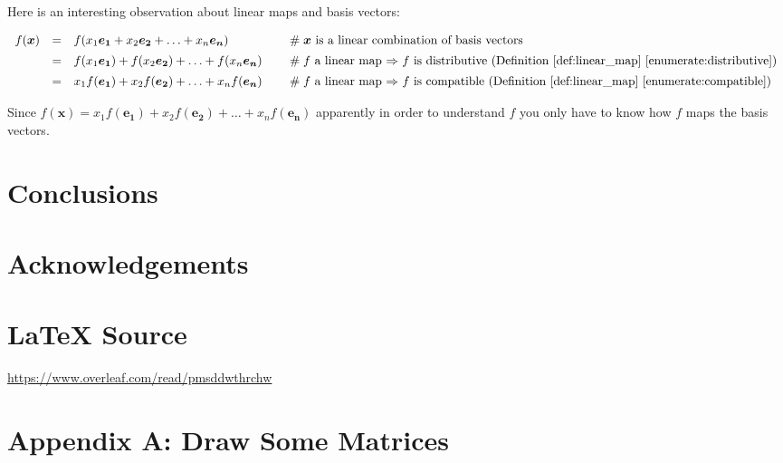 \documentclass{article}
\theoremstyle{definition}
\begin{document}
\bigskip
\noindent
Here is an interesting observation about linear maps and basis vectors:

\begin{equation*}
\begin{array}{llll}
f(\bm{x})
&=& f(x_1 \bm{e_1} + x_2 \bm{e_2} + \hdots + x_n \bm{e_n})				
		&\hspace{1.25em} \mathrel{\#} \text{$\bm{x}$ is a linear combination 
		of basis vectors} \\
[5pt]
&=& f(x_1 \bm{e_1}) + f(x_2 \bm{e_2}) + \hdots + f(x_n \bm{e_n})
		&\hspace{1.25em} \mathrel{\#} \text{$f$ a linear map $\Rightarrow$ 
		$f$ is distributive (Definition \ref{def:linear_map} 
		\ref{enumerate:distributive})} \\
[5pt]
&=& x_1 f(\bm{e_1}) + x_2 f(\bm{e_2}) + \hdots + x_n f(\bm{e_n})
		&\hspace{1.25em} \mathrel{\#} \text{$f$ a linear map $\Rightarrow$ 
		$f$ is compatible (Definition \ref{def:linear_map} 
		\ref{enumerate:compatible})} \\
\end{array}
\end{equation*}

\medskip
\noindent
Since $f(\bm{x}) = x_1 f(\bm{e_1}) + x_2 f(\bm{e_2}) + \hdots + x_n f(\bm{e_n})$
apparently in order to understand $f$ you only have to know how $f$ maps the
basis vectors.																						
%
%
%
\section{Conclusions}
\label{sec:conclusions}
%
%
%
\section{Acknowledgements}
\label{sec:acknowledgements}
%
%
\section*{\LaTeX \hspace{0.025 mm} Source}
\url{https://www.overleaf.com/read/pmsddwthrchw}
%
%
%
%


%
%
%
\section*{Appendix A: Draw Some Matrices}
\end{document}
